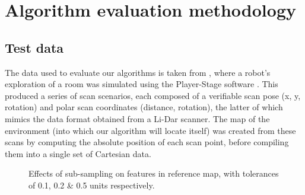 \documentclass[authoryearcitations]{UoYCSproject}
\begin{document}
\chapter{Algorithm evaluation methodology}
\label{cha:system_design}

\section{Test data}
The data used to evaluate our algorithms is taken from \citet{Lenac2011-co}, where a robot's exploration of a room was simulated using the Player-Stage software \cite{noauthor_undated-yv}. This produced a series of scan scenarios, each composed of a verifiable scan pose (x, y, rotation) and polar scan coordinates (distance, rotation), the latter of which  mimics the data format obtained from a Li-Dar scanner. The map of the environment (into which our algorithm will locate itself) was created from these scans by computing the absolute position of each scan point, before compiling them into a single set of Cartesian data. \newline

\begin{figure}[ht]
\begin{subfigure}[b]{0.30\textwidth}
\end{subfigure}
\begin{subfigure}[b]{0.30\textwidth}
\end{subfigure}
\begin{subfigure}[b]{0.30\textwidth}
\end{subfigure}
\caption{Effects of sub-sampling on features in reference map, with tolerances of 0.1, 0.2 \& 0.5 units respectively.}
\label{fig:map_density}
\end{figure}
\end{document}
